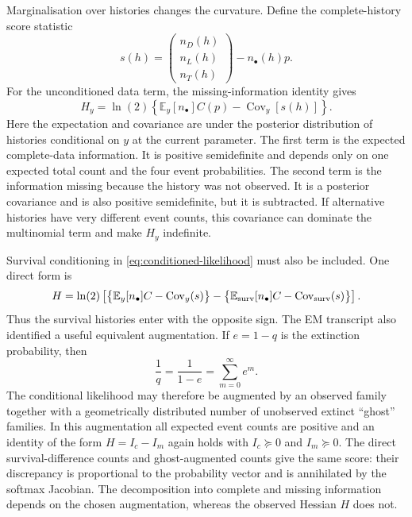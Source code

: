 \documentclass[11pt]{article}
\newcommand{\E}{\mathbb{E}}
\newcommand{\Cov}{\operatorname{Cov}}
\begin{document}
Marginalisation over histories changes the curvature.  Define the complete-history score statistic
\[
  s(h)=
  \begin{pmatrix}n_D(h)\\n_L(h)\\n_T(h)\end{pmatrix}
  -n_\bullet(h)p.
\]
For the unconditioned data term, the missing-information identity gives
\begin{equation}
  H_y
  =\ln(2)\left\{
     \E_y[n_\bullet]C(p)-\Cov_y[s(h)]
   \right\}.                                         \label{eq:louis-data}
\end{equation}
Here the expectation and covariance are under the posterior distribution of histories conditional
on $y$ at the current parameter.  The first term is the expected complete-data information.  It is
positive semidefinite and depends only on one expected total count and the four event probabilities.
The second term is the information missing because the history was not observed.  It is a posterior
covariance and is also positive semidefinite, but it is subtracted.  If alternative histories have
very different event counts, this covariance can dominate the multinomial term and make $H_y$
indefinite.

Survival conditioning in \eqref{eq:conditioned-likelihood} must also be included.  One direct form is
\begin{equation}
  H
  =\ln(2)\left[
    \bigl\{\E_y[n_\bullet]C-\Cov_y(s)\bigr\}
    -\bigl\{\E_{\rm surv}[n_\bullet]C-\Cov_{\rm surv}(s)\bigr\}
  \right].                                           \label{eq:conditioned-information}
\end{equation}
Thus the survival histories enter with the opposite sign.  The EM transcript also identified a
useful equivalent augmentation.  If $e=1-q$ is the extinction probability, then
\[
  \frac1q=\frac1{1-e}=\sum_{m=0}^{\infty}e^m.
\]
The conditional likelihood may therefore be augmented by an observed family together with a
geometrically distributed number of unobserved extinct ``ghost'' families.  In this augmentation
all expected event counts are positive and an identity of the form
$H=I_c-I_m$ again holds with $I_c\succeq0$ and $I_m\succeq0$.  The direct survival-difference
counts and ghost-augmented counts give the same score: their discrepancy is proportional to the
probability vector and is annihilated by the softmax Jacobian.  The decomposition into complete and
missing information depends on the chosen augmentation, whereas the observed Hessian $H$ does not.
\end{document}
